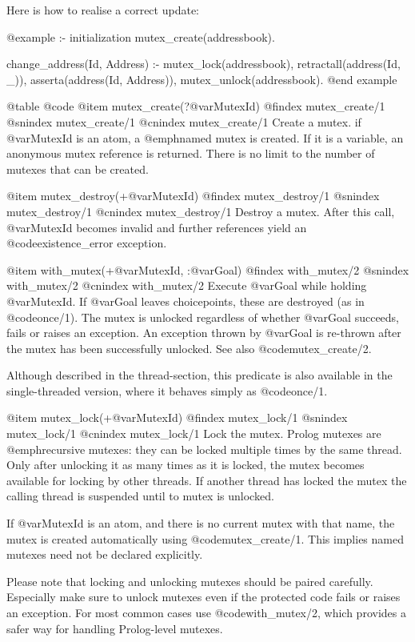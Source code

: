 {{{{{{{{Here is how to realise a correct update:

@example
:- initialization
	mutex_create(addressbook).

change_address(Id, Address) :-
	mutex_lock(addressbook),
	retractall(address(Id, _)),
	asserta(address(Id, Address)),
	mutex_unlock(addressbook).
@end example


@table @code
@item mutex_create(?@var{MutexId})
@findex mutex_create/1
@snindex mutex_create/1
@cnindex mutex_create/1
Create a mutex.  if @var{MutexId} is an atom, a @emph{named} mutex is
created.  If it is a variable, an anonymous mutex reference is returned.
There is no limit to the number of mutexes that can be created.

@item mutex_destroy(+@var{MutexId})
@findex mutex_destroy/1
@snindex mutex_destroy/1
@cnindex mutex_destroy/1
Destroy a mutex.  After this call, @var{MutexId} becomes invalid and
further references yield an @code{existence_error} exception.

@item with_mutex(+@var{MutexId}, :@var{Goal})
@findex with_mutex/2
@snindex with_mutex/2
@cnindex with_mutex/2
Execute @var{Goal} while holding @var{MutexId}.  If @var{Goal} leaves
choicepoints, these are destroyed (as in @code{once/1}).  The mutex is unlocked
regardless of whether @var{Goal} succeeds, fails or raises an exception.
An exception thrown by @var{Goal} is re-thrown after the mutex has been
successfully unlocked.  See also @code{mutex_create/2}.

Although described in the thread-section, this predicate is also
available in the single-threaded version, where it behaves simply as
@code{once/1}.

@item mutex_lock(+@var{MutexId})
@findex mutex_lock/1
@snindex mutex_lock/1
@cnindex mutex_lock/1
Lock the mutex.  Prolog mutexes are @emph{recursive} mutexes: they
can be locked multiple times by the same thread.  Only after unlocking
it as many times as it is locked, the mutex becomes available for
locking by other threads. If another thread has locked the mutex the
calling thread is suspended until to mutex is unlocked.

If @var{MutexId} is an atom, and there is no current mutex with that
name, the mutex is created automatically using @code{mutex_create/1}.  This
implies named mutexes need not be declared explicitly.

Please note that locking and unlocking mutexes should be paired
carefully. Especially make sure to unlock mutexes even if the protected
code fails or raises an exception. For most common cases use
@code{with_mutex/2}, which provides a safer way for handling Prolog-level
mutexes.

}}}}}}}}
